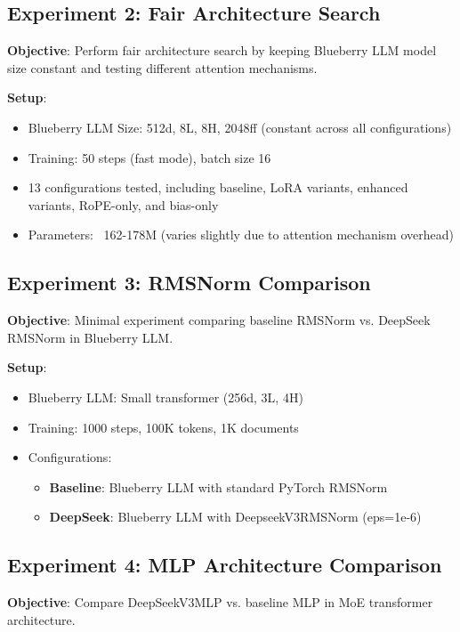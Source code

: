\documentclass[11pt,a4paper]{article}
\begin{document}
\subsection{Experiment 2: Fair Architecture Search}

\textbf{Objective}: Perform fair architecture search by keeping Blueberry LLM model size constant and testing different attention mechanisms.

\textbf{Setup}:
\begin{itemize}
    \item Blueberry LLM Size: 512d, 8L, 8H, 2048ff (constant across all configurations)
    \item Training: 50 steps (fast mode), batch size 16
    \item 13 configurations tested, including baseline, LoRA variants, enhanced variants, RoPE-only, and bias-only
    \item Parameters: ~162-178M (varies slightly due to attention mechanism overhead)
\end{itemize}

\subsection{Experiment 3: RMSNorm Comparison}

\textbf{Objective}: Minimal experiment comparing baseline RMSNorm vs. DeepSeek RMSNorm in Blueberry LLM.

\textbf{Setup}:
\begin{itemize}
    \item Blueberry LLM: Small transformer (256d, 3L, 4H)
    \item Training: 1000 steps, 100K tokens, 1K documents
    \item Configurations:
    \begin{itemize}
        \item \textbf{Baseline}: Blueberry LLM with standard PyTorch RMSNorm
        \item \textbf{DeepSeek}: Blueberry LLM with DeepseekV3RMSNorm (eps=1e-6)
    \end{itemize}
\end{itemize}

\subsection{Experiment 4: MLP Architecture Comparison}

\textbf{Objective}: Compare DeepSeekV3MLP vs. baseline MLP in MoE transformer architecture.
\end{document}
